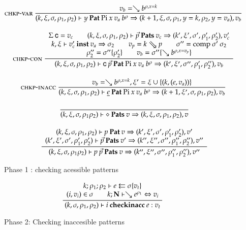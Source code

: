 \begin{figure}[p]
\begin{gather*}
\nru{\chkpvar}
{v_b = \wh \cl{b}{\ins{\rho}{x}{k}}}
{
\checkp
{k,\xi,\sigma,\rho_1,\rho_2}
{y}
{\vpi \: x \: v_a \: \cl{b}{\rho}}
{k+1,\xi,\sigma,\ins{\rho_1}{y}{k},\ins{\rho_2}{y}{v_a}}
{v_b}}
\\[2ex]
\nxru{\chkpcon}
{\Sig \: {\cc}=v_c \qquad
\checkps{k,\xi,\sigma,\rho_1,\rho_2}
{\vec{p}}
{v_c}
{k',\xi',\sigma',\rho_1',\rho_2'}
{v'_c}
}
{\unify{k}{\xi}{v'_c}{v_a}{\sigma_2}
\qquad
v_p = \ptv{k}{p}    
\qquad
\sigma'' = \compS{\sigma'}{\sigma_2}
}
{
\rho''_2 = \substEnv{\sigma''}{\rho'_2} \qquad
v_b = \subst{\sigma''}{\wh \cl{b}{\ins{\rho}{x}{v_p}}}
}
{\checkp
{k,\xi,\sigma,\rho_1,\rho_2}
{\cc \: \vec{p}}
{\vpi \: x \: v_a \: \cl{b}{\rho}}
{k',\xi',\sigma'',\rho'_1,\rho''_2}
{v_b}
}
\\[2ex]
\nru{\chkpinacc}
{v_b = \wh \cl{b}{\ins{\rho}{x}{k}} , \xi' = \xi \cup \{ (k,(e,v_a)) \} } 
{
\checkp
{k,\xi,\sigma,\rho_1,\rho_2}
{\inacc{e}}
{\vpi \: x \: v_a \: \cl{b}{\rho}}
{k+1,\xi',\sigma,\rho_1,\rho_2}
{v_b}}
\\[2ex]
\nru{}
{}
{
\checkps
{k,\xi,\sigma,\rho_1\rho_2}
{\diamond}
{v}
{k,\xi,\sigma,\rho_1,\rho_2}
{v}}
\\[2ex]
\ndru{}
{\checkp
{k,\xi,\sigma,\rho_1,\rho_2}
{p}
{v}
{k',\xi',\sigma',\rho'_1,\rho'_2}
{v'}
}
{\checkps
{k',\xi',\sigma',\rho'_1,\rho'_2}
{\vec{p}}
{v'}
{k'',\xi'',\sigma'',\rho''_1,\rho''_2}
{v''}
}
{
\checkps
{k,\xi,\sigma,\rho_1\rho_2}
{p \: \vec{p}}
{v}
{k'',\xi'',\sigma'',\rho''_1,\rho''_2}
{v''}}
\end{gather*}
\caption{Phase 1 : checking acessible patterns}
\end{figure}

\begin{figure}[p]
\begin{gather*}
\ \dfrac{\begin{array}[b]{c}
k;\rho_1;\rho_2\vdash e\leftleftarrows\sigma\{v_t\}
\\
(i,v_i) \in \sigma \qquad k;\mathbf{N}\vdash\searrow e^{\rho_1}\Leftrightarrow v_i
\end{array}}{
(k,\sigma,\rho_1,\rho_2)\vdash i\:\mathbf{checkinacc}\:e : v_t
}
\end{gather*}
\caption{Phase 2: Checking inaccesible patterns}
\end{figure}

